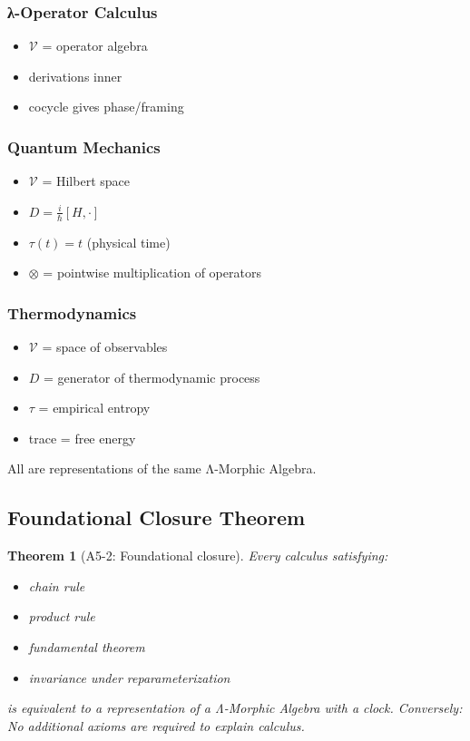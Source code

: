 \documentclass[12pt, oneside]{article}
\newtheorem{theorem}{Theorem}[section]
\begin{document}
\subsubsection{λ-Operator Calculus}
\begin{itemize}
    \item $\mathcal{V}$ = operator algebra
    \item derivations inner
    \item cocycle gives phase/framing
\end{itemize}

\subsubsection{Quantum Mechanics}
\begin{itemize}
    \item $\mathcal{V}$ = Hilbert space
    \item $D = \frac{i}{\hbar}[H, \cdot]$
    \item $\tau(t) = t$ (physical time)
    \item $\otimes$ = pointwise multiplication of operators
\end{itemize}

\subsubsection{Thermodynamics}
\begin{itemize}
    \item $\mathcal{V}$ = space of observables
    \item $D$ = generator of thermodynamic process
    \item $\tau$ = empirical entropy
    \item trace = free energy
\end{itemize}

All are representations of the same Λ-Morphic Algebra.

\subsection{Foundational Closure Theorem}

\begin{theorem}[A5-2: Foundational closure]
Every calculus satisfying:
\begin{itemize}
    \item chain rule
    \item product rule
    \item fundamental theorem
    \item invariance under reparameterization
\end{itemize}
is equivalent to a representation of a Λ-Morphic Algebra with a clock. Conversely: No additional axioms are required to explain calculus.
\end{theorem}
\end{document}
